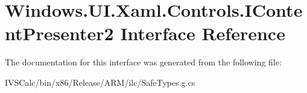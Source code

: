 \hypertarget{interface_windows_1_1_u_i_1_1_xaml_1_1_controls_1_1_i_content_presenter2}{}\section{Windows.\+U\+I.\+Xaml.\+Controls.\+I\+Content\+Presenter2 Interface Reference}
\label{interface_windows_1_1_u_i_1_1_xaml_1_1_controls_1_1_i_content_presenter2}


The documentation for this interface was generated from the following file\+:\begin{DoxyCompactItemize}
\item 
I\+V\+S\+Calc/bin/x86/\+Release/\+A\+R\+M/ilc/Safe\+Types.\+g.\+cs\end{DoxyCompactItemize}
